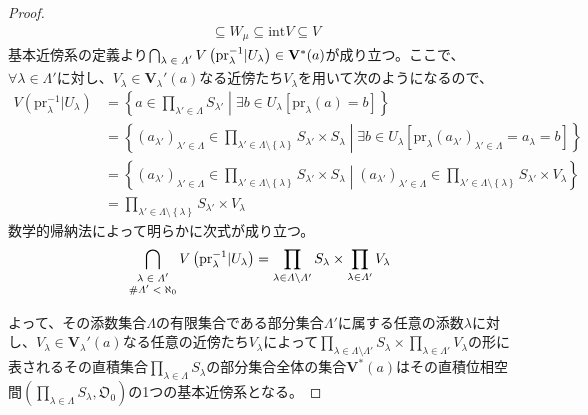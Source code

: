 \documentclass[dvipdfmx]{jsarticle}
\begin{document}
\begin{proof}
\begin{align*}
&\subseteq W_{\mu} \subseteq {\mathrm{int}}V \subseteq V
\end{align*}
基本近傍系の定義より$\bigcap_{\scriptsize \begin{matrix}
\lambda \in \varLambda' \\
\end{matrix}} {V\left( {\mathrm{pr}}_{\lambda}^{- 1}|U_{\lambda} \right)} \in \mathbf{V}^{*}(a)$が成り立つ。ここで、$\forall\lambda \in \varLambda'$に対し、$V_{\lambda} \in \mathbf{V}_{\lambda}'(a)$なる近傍たち$V_{\lambda}$を用いて次のようになるので、
\begin{align*}
V\left( {\mathrm{pr}}_{\lambda}^{- 1}|U_{\lambda} \right) &= \left\{ a \in \prod_{\lambda' \in \varLambda} S_{\lambda'} \middle| \exists b \in U_{\lambda}\left[ {\mathrm{pr}}_{\lambda}(a) = b \right] \right\}\\
&= \left\{ \left( a_{\lambda'} \right)_{\lambda' \in \varLambda} \in \prod_{\lambda' \in \varLambda \setminus \left\{ \lambda \right\}} S_{\lambda'} \times S_{\lambda} \middle| \exists b \in U_{\lambda}\left[ {\mathrm{pr}}_{\lambda}\left( a_{\lambda'} \right)_{\lambda' \in \varLambda} = a_{\lambda} = b \right] \right\}\\
&= \left\{ \left( a_{\lambda'} \right)_{\lambda' \in \varLambda} \in \prod_{\lambda' \in \varLambda \setminus \left\{ \lambda \right\}} S_{\lambda'} \times S_{\lambda} \middle| \left( a_{\lambda'} \right)_{\lambda' \in \varLambda} \in \prod_{\lambda' \in \varLambda \setminus \left\{ \lambda \right\}} S_{\lambda'} \times V_{\lambda} \right\}\\
&= \prod_{\lambda' \in \varLambda \setminus \left\{ \lambda \right\}} S_{\lambda'} \times V_{\lambda}
\end{align*}
数学的帰納法によって明らかに次式が成り立つ。
\begin{align*}
\bigcap_{\scriptsize \begin{matrix}
\lambda \in \varLambda' \\
{\#}\varLambda' < \aleph_{0} \\
\end{matrix}} {V\left( {\mathrm{pr}}_{\lambda}^{- 1}|U_{\lambda} \right)} = \prod_{\lambda \in \varLambda \setminus \varLambda'} S_{\lambda} \times \prod_{\lambda \in \varLambda'} V_{\lambda}
\end{align*}\par
よって、その添数集合$\varLambda$の有限集合である部分集合$\varLambda'$に属する任意の添数$\lambda$に対し、$V_{\lambda} \in \mathbf{V}_{\lambda}'(a)$なる任意の近傍たち$V_{\lambda}$によって$\prod_{\lambda \in \varLambda \setminus \varLambda'} S_{\lambda} \times \prod_{\lambda \in \varLambda'} V_{\lambda}$の形に表されるその直積集合$\prod_{\lambda \in \varLambda} S_{\lambda}$の部分集合全体の集合$\mathbf{V}^{*}(a)$はその直積位相空間$\left( \prod_{\lambda \in \varLambda} S_{\lambda},\mathfrak{O}_{0} \right)$の1つの基本近傍系となる。
\end{proof}
\end{document}
